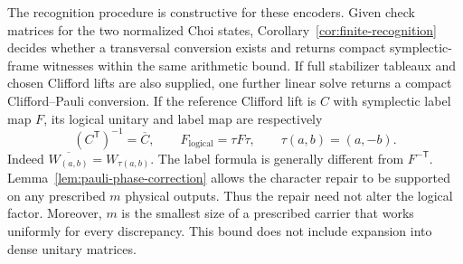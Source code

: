 The recognition procedure is constructive for these encoders.  Given check
matrices for the two normalized Choi states,
Corollary~\ref{cor:finite-recognition} decides whether a transversal conversion
exists and returns compact symplectic-frame witnesses within the same
arithmetic bound.  If full stabilizer tableaux and chosen Clifford lifts are
also supplied, one further linear solve returns a compact Clifford--Pauli
conversion.  If the reference Clifford lift is \(C\) with symplectic
label map \(F\), its logical unitary and label map are respectively
\[
 (C^{\mathsf T})^{-1}=\overline C,
 \qquad F_{\mathrm{logical}}=\tau F\tau,
 \qquad \tau(a,b)=(a,-b).
\]
Indeed \(\overline{W_{(a,b)}}=W_{\tau(a,b)}\).
The label formula is generally different from \(F^{-\mathsf T}\).
Lemma~\ref{lem:pauli-phase-correction} allows the character repair to be
supported on any prescribed \(m\) physical outputs.  Thus the repair need not
alter the logical factor.  Moreover, \(m\) is the smallest size of a
prescribed carrier that works uniformly for every discrepancy.  This bound
does not include expansion into dense unitary matrices.
